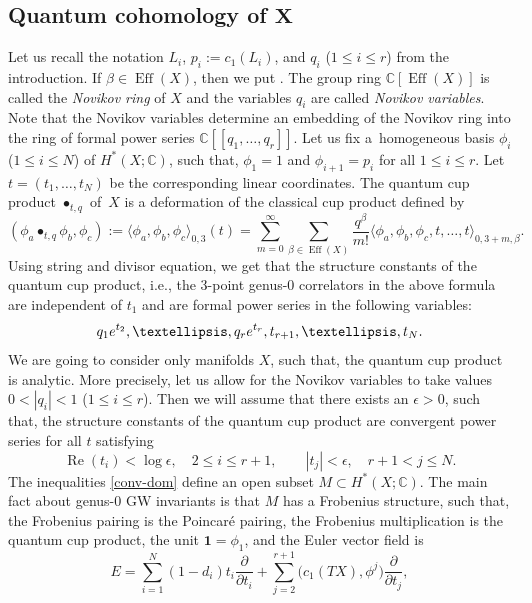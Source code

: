 \documentclass[10pt,a4paper]{article}
\numberwithin{equation}{section}
\newcommand{\CC}{\mathbb{C}}
\newcommand{\one}{\mathbf{1}}
\begin{document}
\subsection[Quantum cohomology of X]{Quantum cohomology of $\boldsymbol{X}$}\label{sec:qcoh}
Let us recall the notation $L_i$, $p_i:=c_1(L_i)$, and $q_i$ ($1\leq i\leq r$) from the introduction. If $\beta\in \operatorname{Eff}(X)$, then we put
. The group ring
$\CC[\operatorname{Eff}(X)]$ is called the {\em Novikov ring} of $X$
and the variables $q_i$ are called {\em Novikov variables}. Note that
the Novikov variables determine an embedding of the Novikov ring into
the ring of formal power series $\CC[\![q_1,\dots,q_r]\!]$.
Let us fix a~homogeneous basis $\phi_i$ ($1\leq i\leq N$) of $H^*(X;\CC)$, such that, $\phi_1=1$ and $\phi_{i+1}=p_i$ for all $1\leq i\leq r$. Let
$t=(t_1,\dots,t_N)$ be the corresponding linear coordinates. The
quantum cup product $\bullet_{t,q}$ of~$X$ is a deformation of the
classical cup product defined by
\[
(\phi_a\bullet_{t,q} \phi_b,\phi_c):=
\langle \phi_a, \phi_b,\phi_c\rangle_{0,3}(t) =
\sum_{m=0}^\infty
\sum_{\beta\in \operatorname{Eff}(X) }
\frac{q^\beta}{m!}
\langle
\phi_a,\phi_b,\phi_c,t,\dots,t\rangle_{0,3+m,\beta}.
\]
Using string and divisor equation, we get that the structure constants of the
quantum cup product, i.e., the 3-point genus-0 correlators in the above
formula are independent of $t_1$ and are formal power series in the
following variables:
\[
q_1 {\rm e}^{t_2},\dots, q_r {\rm e}^{t_r}, t_{r+1},\dots, t_N.
\]
We are going to consider only manifolds $X$, such that, the quantum
cup product is analytic. More precisely, let us allow for the Novikov
variables to take values $0<|q_i|<1$ ($1\leq i\leq r$). Then we will
assume that there exists an $\epsilon>0$, such that, the structure
constants of the quantum cup product are convergent power series for
all $t$ satisfying
\begin{equation}\label{conv-dom}
\operatorname{Re}(t_i)<\log \epsilon, \quad 2\leq i\leq r+1,\qquad
|t_j|<\epsilon, \quad r+1<j\leq N.
\end{equation}
The inequalities \eqref{conv-dom} define an open subset $M\subset
H^*(X;\CC)$. The main fact about genus-0 GW invariants is that $M$
has a Frobenius structure, such that, the Frobenius pairing is the
Poincar\'e pairing, the Frobenius multiplication is the quantum cup
product, the unit $\one=\phi_1$, and the Euler vector field is
\[
E=\sum_{i=1}^N (1-d_i) t_i \frac{\partial}{\partial t_i} +
\sum_{j=2}^{r+1} \big(c_1(TX),\phi^j\big) \frac{\partial}{\partial t_j},
\]
\end{document}
